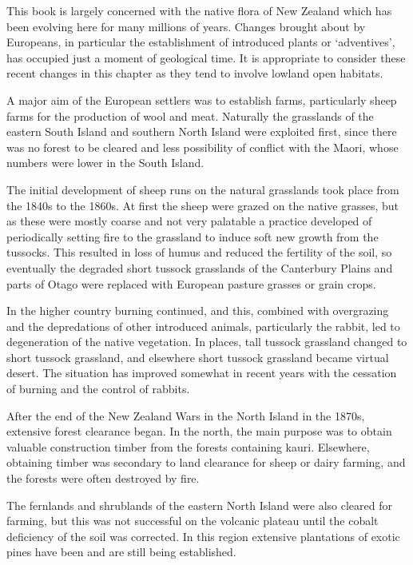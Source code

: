This book is largely concerned with the native flora of New Zealand which has been evolving here for many millions of years.
Changes brought about by Europeans, in particular the establishment of introduced plants or `adventives', has occupied just a moment of geological time.
It is appropriate to consider these recent changes in this chapter as they tend to involve lowland open habitats.

A major aim of the European settlers was to establish farms, particularly sheep farms for the production of wool and meat.
Naturally the grasslands of the eastern South Island and southern North Island were exploited first, since there was no forest to be cleared and less possibility of conflict with the Maori, whose numbers were lower in the South Island.

The initial development of sheep runs on the natural grasslands took place from the 1840s to the 1860s.
At first the sheep were grazed on the native grasses, but as these were mostly coarse and not very palatable a practice developed of periodically setting fire to the grassland to induce soft new growth from the tussocks.
This resulted in loss of humus and reduced the fertility of the soil, so eventually the degraded short tussock grasslands of the Canterbury Plains and parts of Otago were replaced with European pasture grasses or grain crops.

In the higher country burning continued, and this, combined with overgrazing and the depredations of other introduced animals, particularly the rabbit, led to degeneration of the native vegetation.
In places, tall tussock grassland changed to short tussock grassland, and elsewhere short tussock grassland became virtual desert.
The situation has improved somewhat in recent years with the cessation of burning and the control of rabbits.

After the end of the New Zealand Wars in the North Island in the 1870s, extensive forest clearance began.
In the north, the main purpose was to obtain valuable construction timber from the forests containing kauri.
Elsewhere, obtaining timber was secondary to land clearance for sheep or dairy farming, and the forests were often destroyed by fire.

The fernlands and shrublands of the eastern North Island were also cleared for farming, but this was not successful on the volcanic plateau until the cobalt deficiency of the soil was corrected.
In this region extensive plantations of exotic pines have been and are still being established.

